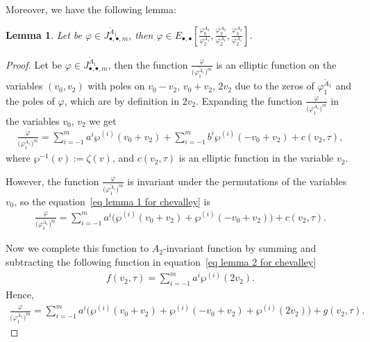 \documentclass[10pt,a4paper]{amsart}
\numberwithin{equation}{section}
\newtheorem{Lemma}[Theorem]{Lemma}
\begin{document}
Moreover, we have the following lemma:
\begin{Lemma}
Let be $\varphi\in J_{\bullet,\bullet,m}^{\tilde A_1}$, then $\varphi \in E_{\bullet,\bullet}\left[\frac{\varphi_0^{A_{2}}}{\varphi_2^{A_1}}, \frac{\varphi_2^{A_{2}}}{\varphi_2^{A_1}},\frac{\varphi_3^{A_{2}}}{\varphi_2^{A_1}}\right]$.
\end{Lemma}

\begin{proof}
Let be $\varphi\in J_{\bullet,\bullet,m}^{\tilde A_1}$, then the function $\frac{\varphi}{\big(\varphi_1^{\tilde A_1}\big)^m}$ is an elliptic function on the variables $(v_0,v_2)$ with poles on $v_0-v_2$, $v_0+v_2$, $2v_2$ due to the zeros of $\varphi_1^{\tilde A_1}$ and the poles of $\varphi$, which are by definition in $2v_2$. Expanding the function $\frac{\varphi}{\big(\varphi_1^{\tilde A_1}\big)^m}$ in the variables $v_0$, $v_2$ we get{\samepage
\begin{gather}
\label{eq lemma 1 for chevalley}
\frac{\varphi}{\big(\varphi_1^{\tilde A_1}\big)^m}=\sum_{i=-1}^{m} a^i\wp^{(i)}(v_0+v_{2})+\sum_{i=-1}^{m} b^i\wp^{(i)}(-v_0+v_{2})+c(v_2,\tau),
\end{gather}
where $\wp^{-1}(v):=\zeta(v)$, and $c(v_2,\tau)$ is an elliptic function in the variable $v_2$.}

However, the function $\frac{\varphi}{\big(\varphi_1^{\tilde A_1}\big)^m}$ is invariant under the permutations of the variables $v_0$, so the equation~\eqref{eq lemma 1 for chevalley} is
\begin{gather}
\label{eq lemma 2 for chevalley}
\frac{\varphi}{\big(\varphi_1^{\tilde A_1}\big)^m}=\sum_{i=-1}^{m} a^i\big(\wp^{(i)}(v_0+v_{2})+\wp^{(i)}(-v_0+v_{2})\big)+c(v_2,\tau).
\end{gather}

Now we complete this function to $A_{2}$-invariant function by summing and subtracting the following function in equation~\eqref{eq lemma 2 for chevalley}
\begin{gather*}
f(v_{2},\tau)=\sum_{i=-1}^{m} a^i\wp^{(i)}(2v_2).
\end{gather*}
Hence,
\begin{gather}
\label{eq lemma 3 for chevalley}
\frac{\varphi}{\big(\varphi_1^{\tilde A_1}\big)^m}=\sum_{i=-1}^{m} a^i\big(\wp^{(i)}(v_0+v_{2})+\wp^{(i)}(-v_0+v_{2})+\wp^{(i)}(2v_2)\big)+g(v_2,\tau).
\end{gather}


\end{proof}
\end{document}
